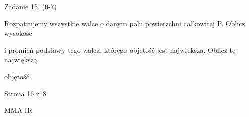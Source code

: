 \documentclass[a4paper,12pt]{article}
\begin{document}
Zadanie 15. (0-7)

Rozpatrujemy wszystkie walce o danym polu powierzchni całkowitej P. Oblicz wysokość

i promień podstawy tego walca, którego objętość jest największa. Oblicz tę największą

objętość.

Strona 16 z18

MMA-IR
\end{document}
